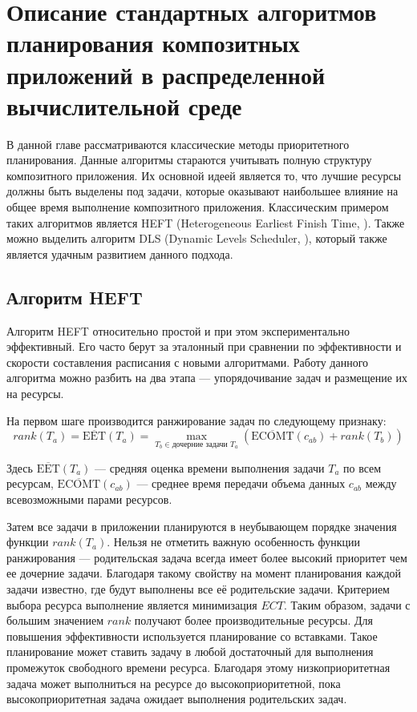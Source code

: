 \chapter*{Описание стандартных алгоритмов планирования композитных приложений в распределенной вычислительной среде}
\begin{spacing}{1.5}

В данной главе рассматриваются классические методы приоритетного планирования. Данные алгоритмы стараются учитывать полную структуру композитного приложения. Их основной идеей является то, что лучшие ресурсы должны быть выделены под задачи, которые оказывают наибольшее влияние на общее время выполнение композитного приложения.  Классическим примером таких алгоритмов является HEFT (Heterogeneous Earliest Finish Time, \cite{HEFT}). Также можно выделить алгоритм DLS (Dynamic Levels Scheduler, \cite{DLS}), который также является удачным развитием данного подхода.



\section*{Алгоритм HEFT}

Алгоритм HEFT относительно простой и при этом экспериментально эффективный. Его часто берут за эталонный при сравнении по эффективности и скорости составления расписания с новыми алгоритмами. Работу данного алгоритма можно разбить на два этапа --- упорядочивание задач и размещение их на ресурсы.


На первом шаге производится ранжирование задач по следующему признаку:
$$
rank(T_a) = \overline{\mbox{EET}}(T_a) = \max_{T_b \in \text{дочерние задачи $T_a$}}(\overline{\mbox{ECOMT}} (c_{ab}) + rank (T_b))
$$

Здесь $\overline{\mbox{EET}}(T_a)$ --- средняя оценка времени выполнения задачи $T_a$ по всем ресурсам, $\overline{\mbox{ECOMT}}(c_{ab})$ --- среднее время передачи объема данных $c_{ab}$ между всевозможными парами ресурсов.

Затем все задачи в приложении планируются в неубывающем порядке значения функции $rank(T_a)$. Нельзя не отметить важную особенность функции ранжирования --- родительская задача всегда имеет более высокий приоритет чем ее дочерние задачи. Благодаря такому свойству на момент планирования каждой задачи известно, где будут выполнены все её родительские задачи. Критерием выбора ресурса выполнение является минимизация $ECT$. Таким образом, задачи с большим значением $rank$ получают более производительные ресурсы. Для повышения эффективности используется планирование со вставками. Такое планирование может ставить задачу в любой достаточный для выполнения промежуток свободного времени ресурса. Благодаря этому низкоприоритетная задача может выполниться на ресурсе до высокоприоритетной, пока высокоприоритетная задача ожидает выполнения родительских задач.


\end{spacing}
